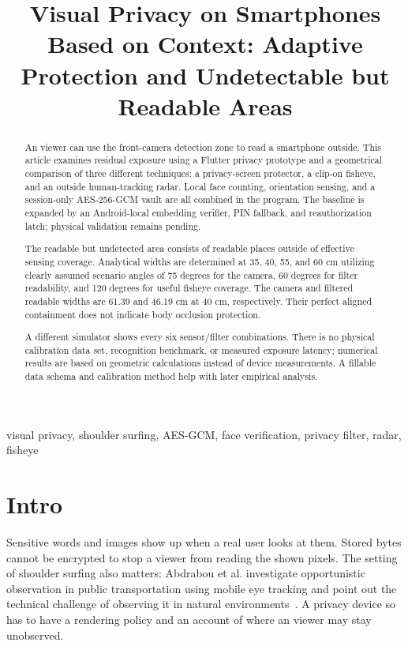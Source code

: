 \documentclass[conference]{IEEEtran}
\title{Visual Privacy on Smartphones Based on Context: Adaptive Protection and Undetectable but Readable Areas}
\author{\IEEEauthorblockN{Author particulars still pending}\IEEEauthorblockA{Prototype of a university project\\Organisation and contact information still to be determined}}
\begin{document}
\maketitle

\begin{abstract}
An viewer can use the front-camera detection zone to read a smartphone outside. This article examines residual exposure using a Flutter privacy prototype and a geometrical comparison of three different techniques: a privacy-screen protector, a clip-on fisheye, and an outside human-tracking radar. Local face counting, orientation sensing, and a session-only AES-256-GCM vault are all combined in the program. The baseline is expanded by an Android-local embedding verifier, PIN fallback, and reauthorization latch; physical validation remains pending.

The readable but undetected area consists of readable places outside of effective sensing coverage. Analytical widths are determined at 35, 40, 55, and 60 cm utilizing clearly assumed scenario angles of 75 degrees for the camera, 60 degrees for filter readability, and 120 degrees for useful fisheye coverage. The camera and filtered readable widths are 61.39 and 46.19 cm at 40 cm, respectively. Their perfect aligned containment does not indicate body occlusion protection.

A different simulator shows every six sensor/filter combinations. There is no physical calibration data set, recognition benchmark, or measured exposure latency; numerical results are based on geometric calculations instead of device measurements. A fillable data schema and calibration method help with later empirical analysis.
\end{abstract}

\begin{IEEEkeywords}
visual privacy, shoulder surfing, AES-GCM, face verification, privacy filter, radar, fisheye
\end{IEEEkeywords}

\section{Intro}
Sensitive words and images show up when a real user looks at them. Stored bytes cannot be encrypted to stop a viewer from reading the shown pixels. The setting of shoulder surfing also matters: Abdrabou et al. investigate opportunistic observation in public transportation using mobile eye tracking and point out the technical challenge of observing it in natural environments~\cite{Abdrabou2025Shoulder}. A privacy device so has to have a rendering policy and an account of where an viewer may stay unobserved.
\end{document}
